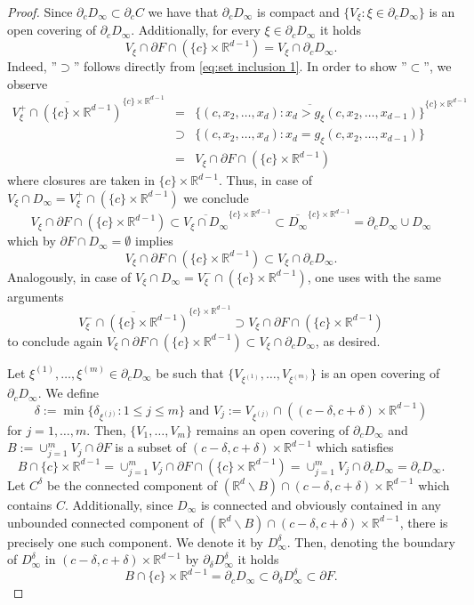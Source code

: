 \documentclass[10pt,leqno]{amsart}
\theoremstyle{definition}
\newcommand{\R}{\mathbb R}
\begin{document}
\begin{proof}
Since $\partial_c D_\infty\subset \partial_c C$ we have that $\partial_c D_\infty$ is compact and $\{V_\xi:\xi\in\partial_c D_\infty\}$ is an open covering of $\partial_c D_\infty$. Additionally, for every $\xi\in \partial_c D_\infty$ it holds
	$$V_\xi\cap\partial F\cap\left(\{c\}\times\R^{d-1}\right)=V_\xi\cap \partial_c D_\infty.$$
Indeed, ''$\supset$'' follows directly from \eqref{eq:set inclusion 1}. In order to show ''$\subset$'', we observe
\begin{eqnarray*}
	\overline{V_\xi^+\cap(\{c\}\times\R^{d-1})}^{\{c\}\times\R^{d-1}}&=&\overline{\{(c,x_2,\ldots,x_d): x_d> g_\xi(c,x_2,\ldots,x_{d-1})\}}^{\{c\}\times\R^{d-1}}\\
	&\supset& \{(c,x_2,\ldots,x_d): x_d= g_\xi(c,x_2,\ldots,x_{d-1})\}\\
	&=&V_\xi\cap \partial F\cap(\{c\}\times\R^{d-1})
\end{eqnarray*}
where closures are taken in $\{c\}\times\R^{d-1}$. Thus, in case of $V_\xi\cap D_\infty=V_\xi^+\cap(\{c\}\times\R^{d-1})$ we conclude
$$V_\xi\cap \partial F\cap(\{c\}\times\R^{d-1})\subset \overline{V_\xi\cap D_\infty}^{\{c\}\times\R^{d-1}}\subset \overline{D_\infty}^{\{c\}\times\R^{d-1}}=\partial_c D_\infty\cup D_\infty$$
which by $\partial F\cap D_\infty=\emptyset$ implies
$$V_\xi\cap\partial F\cap(\{c\}\times\R^{d-1})\subset V_\xi\cap \partial_c D_\infty.$$
Analogously, in case of $V_\xi\cap D_\infty=V_\xi^-\cap(\{c\}\times\R^{d-1})$, one uses with the same arguments
$$\overline{V_\xi^-\cap(\{c\}\times\R^{d-1})}^{\{c\}\times\R^{d-1}}\supset V_\xi\cap \partial F\cap(\{c\}\times\R^{d-1})$$
to conclude again $V_\xi\cap\partial F\cap(\{c\}\times\R^{d-1})\subset V_\xi\cap \partial_c D_\infty$, as desired.

Let $\xi^{(1)},\ldots,\xi^{(m)}\in\partial_c D_\infty$ be such that $\{V_{\xi^{(1)}},\ldots, V_{\xi^{(m)}}\}$ is an open covering of $\partial_c D_\infty$. We define
	$$\delta:=\min\{\delta_{\xi^{(j)}}: 1\leq j\leq  m\}\text{ and }  V_j:=V_{\xi^{(j)}}\cap((c-\delta,c+\delta)\times\R^{d-1})$$
for $j=1,\ldots,m$.
Then, $\{V_1,\ldots, V_m\}$  
remains an open covering of $\partial _c D_\infty$ and $B:=\cup_{j=1}^m V_j\cap \partial F$ is a subset of $(c-\delta,c+\delta)\times \R^{d-1}$ which satisfies
$$B\cap \{c\}\times\R^{d-1}=\cup_{j=1}^m V_j\cap \partial F\cap(\{c\}\times\R^{d-1})=\cup_{j=1}^m V_j\cap \partial_c D_\infty=\partial_c D_\infty.$$
Let $C^\delta$ be the connected component of $(\R^d\backslash B)\cap (c-\delta,c+\delta)\times\R^{d-1}$ which contains $C$. Additionally, since $D_\infty$ is connected and obviously contained in any unbounded connected component of $(\R^d\backslash B)\cap (c-\delta,c+\delta)\times\R^{d-1}$, 
there is precisely one such component. We denote it by $D_\infty^\delta$. Then, denoting the boundary of $D_\infty^\delta$ in $(c-\delta,c+\delta)\times \R^{d-1}$ by $\partial_\delta D_\infty^\delta$ it holds
	$$B\cap\{c\}\times\R^{d-1}=\partial_c D_\infty\subset \partial_\delta D_\infty^\delta\subset\partial F.$$ 


\end{proof}
\end{document}
